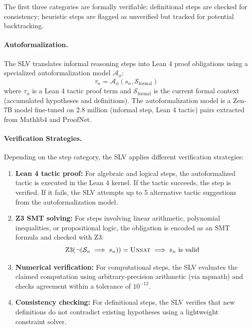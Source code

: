 \documentclass[11pt,a4paper]{article}
\begin{document}
The first three categories are formally verifiable; definitional steps are checked for consistency; heuristic steps are flagged as unverified but tracked for potential backtracking.

\paragraph{Autoformalization.} The SLV translates informal reasoning steps into Lean 4 proof obligations using a specialized autoformalization model $\mathcal{A}_\phi$:
\begin{equation}
    \tau_n = \mathcal{A}_\phi(s_n, \mathcal{S}_{\text{formal}})
\end{equation}
where $\tau_n$ is a Lean 4 tactic proof term and $\mathcal{S}_{\text{formal}}$ is the current formal context (accumulated hypotheses and definitions). The autoformalization model is a Zen-7B model fine-tuned on 2.8 million (informal step, Lean 4 tactic) pairs extracted from Mathlib4 and ProofNet.

\paragraph{Verification Strategies.} Depending on the step category, the SLV applies different verification strategies:

\begin{enumerate}
    \item \textbf{Lean 4 tactic proof:} For algebraic and logical steps, the autoformalized tactic is executed in the Lean 4 kernel. If the tactic succeeds, the step is verified. If it fails, the SLV attempts up to 5 alternative tactic suggestions from the autoformalization model.

    \item \textbf{Z3 SMT solving:} For steps involving linear arithmetic, polynomial inequalities, or propositional logic, the obligation is encoded as an SMT formula and checked with Z3:
    \begin{equation}
        \text{Z3}(\neg(\mathcal{S}_n \implies s_n)) = \textsc{Unsat} \implies s_n \text{ is valid}
    \end{equation}

    \item \textbf{Numerical verification:} For computational steps, the SLV evaluates the claimed computation using arbitrary-precision arithmetic (via mpmath) and checks agreement within a tolerance of $10^{-12}$.

    \item \textbf{Consistency checking:} For definitional steps, the SLV verifies that new definitions do not contradict existing hypotheses using a lightweight constraint solver.
\end{enumerate}
\end{document}
